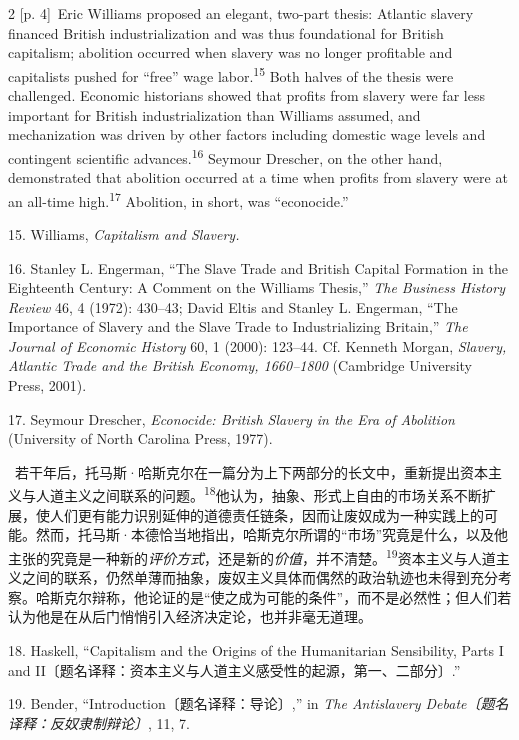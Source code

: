\documentclass[10pt,a4paper]{article}
\begin{document}
\begin{paracol}{2}
\switchcolumn
{\scriptsize\color{gray} [p. 4]}\ Eric Williams proposed an elegant, two-part thesis: Atlantic slavery financed British industrialization and was thus foundational for British capitalism; abolition occurred when slavery was no longer profitable and capitalists pushed for “free” wage labor.\nobreak\textsuperscript{15} Both halves of the thesis were challenged. Economic historians showed that profits from slavery were far less important for British industrialization than Williams assumed, and mechanization was driven by other factors including domestic wage levels and contingent scientific advances.\nobreak\textsuperscript{16} Seymour Drescher, on the other hand, demonstrated that abolition occurred at a time when profits from slavery were at an all-time high.\nobreak\textsuperscript{17} Abolition, in short, was “econocide.”\par{\small 15. Williams, \textit{Capitalism and Slavery.}\par}{\small 16. Stanley L. Engerman, “The Slave Trade and British Capital Formation in the Eighteenth Century: A Comment on the Williams Thesis,” \textit{The Business History Review} 46, 4 (1972): 430–43; David Eltis and Stanley L. Engerman, “The Importance of Slavery and the Slave Trade to Industrializing Britain,” \textit{The Journal of Economic History} 60, 1 (2000): 123–44. Cf. Kenneth Morgan, \textit{Slavery, Atlantic Trade and the British Economy, 1660–1800} (Cambridge University Press, 2001).\par}{\small 17. Seymour Drescher, \textit{Econocide: British Slavery in the Era of Abolition} (University of North Carolina Press, 1977).\par}
\switchcolumn*
{\scriptsize\color{gray} [p. 5]}\ 若干年后，托马斯·哈斯克尔在一篇分为上下两部分的长文中，重新提出资本主义与人道主义之间联系的问\mbox{题。\textsuperscript{18}}他认为，抽象、形式上自由的市场关系不断扩展，使人们更有能力识别延伸的道德责任链条，因而让废奴成为一种实践上的可能。然而，托马斯·本德恰当地指出，哈斯克尔所谓的“市场”究竟是什么，以及他主张的究竟是一种新的\textit{评价方式}，还是新的\textit{价值}，并不清\mbox{楚。\textsuperscript{19}}资本主义与人道主义之间的联系，仍然单薄而抽象，废奴主义具体而偶然的政治轨迹也未得到充分考察。哈斯克尔辩称，他论证的是“使之成为可能的条件”，而不是必然性；但人们若认为他是在从后门悄悄引入经济决定论，也并非毫无道理。\par{\small 18. Haskell, “Capitalism and the Origins of the Humanitarian Sensibility, Parts I and II〔题名译释：资本主义与人道主义感受性的起源，第一、二部分〕.”\par}{\small 19. Bender, “Introduction〔题名译释：导论〕,” in \textit{The Antislavery Debate〔题名译释：反奴隶制辩论〕}, 11, 7.\par}

\end{paracol}
\end{document}
